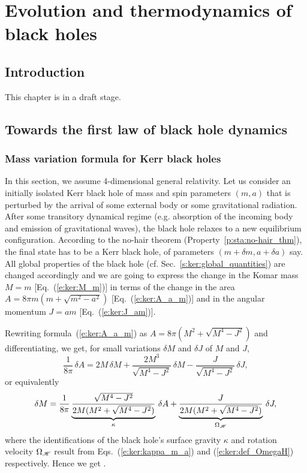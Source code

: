 \chapter{Evolution and thermodynamics of black holes}
\label{s:evo}

\minitoc

\section{Introduction}

This chapter is in a draft stage.

\section{Towards the first law of black hole dynamics} \label{s:evo:towards_1st_law}

\subsection{Mass variation formula for Kerr black holes} \label{s:evo:mass_variation_Kerr}

In this section, we assume 4-dimensional general relativity.
Let us consider an initially isolated Kerr black hole of mass and spin parameters $(m,a)$
that is perturbed by the arrival of some external body or some gravitational
radiation. After some transitory dynamical regime (e.g. absorption of the
incoming body and emission of gravitational waves), the black hole relaxes
to a new equilibrium configuration. According to the
no-hair theorem (Property~\ref{p:sta:no-hair_thm}),
the final state has to be a Kerr black hole, of
parameters $(m+\delta m, a+\delta a)$ say. All global properties of the black
hole (cf. Sec.~\ref{s:ker:global_quantities})
are changed accordingly and we are going to express the change in
the Komar mass $M = m$ [Eq.~(\ref{e:ker:M_m})] in terms of the change in
the area $A = 8 \pi m (m + \sqrt{m^2-a^2})$ [Eq.~(\ref{e:ker:A_a_m})]
and in the angular momentum $J = a m$ [Eq.~(\ref{e:ker:J_am})].

Rewriting formula~(\ref{e:ker:A_a_m}) as $A = 8 \pi (M^2 + \sqrt{M^4 - J^2})$
and differentiating, we get, for small variations $\delta M$ and $\delta J$
of $M$ and $J$,
\[
\frac{1}{8\pi} \, \delta A =  2 M\,  \delta M + \frac{2M^3}{\sqrt{M^4-J^2}}\, \delta M
    - \frac{J}{\sqrt{M^4-J^2}}\, \delta J ,
\]
or equivalently
\[
    \delta M = \frac{1}{8\pi}
\underbrace{\frac{\sqrt{M^4-J^2}}{2M(M^2+\sqrt{M^4-J^2})}}_{\kappa} \, \delta A
+ \underbrace{\frac{J}{2M(M^2+\sqrt{M^4-J^2})}}_{\Omega_{\mathscr{H}}} \, \delta J  ,
\]
where the identifications of the black hole's surface gravity $\kappa$ and
rotation velocity $\Omega_{\mathscr{H}}$ result from Eqs.~(\ref{e:ker:kappa_m_a})
and (\ref{e:ker:def_OmegaH}) respectively. Hence we get
\be \label{e:evo:mass_variation_Kerr}
     .
\ee

